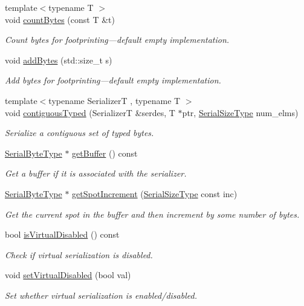 \begin{DoxyCompactItemize}
{\footnotesize template$<$typename T $>$ }\\void \hyperlink{structcheckpoint_1_1_serializer_a805ae9ce395614512dfb6b0bd2c22881}{count\+Bytes} (const T \&t)
\begin{DoxyCompactList}\small\item\em Count bytes for footprinting---default empty implementation. \end{DoxyCompactList}\item 
void \hyperlink{structcheckpoint_1_1_serializer_a52cd27806c3b821605d723900ec7d2e5}{add\+Bytes} (std\+::size\+\_\+t s)
\begin{DoxyCompactList}\small\item\em Add bytes for footprinting---default empty implementation. \end{DoxyCompactList}\item 
{\footnotesize template$<$typename SerializerT , typename T $>$ }\\void \hyperlink{structcheckpoint_1_1_serializer_af2f453fc63424918a16ea6024d576a3e}{contiguous\+Typed} (SerializerT \&serdes, T $\ast$ptr, \hyperlink{namespacecheckpoint_a083f6674da3f94c2901b18c6d238217c}{Serial\+Size\+Type} num\+\_\+elms)
\begin{DoxyCompactList}\small\item\em Serialize a contiguous set of typed bytes. \end{DoxyCompactList}\item 
\hyperlink{namespacecheckpoint_ae57f01cdc0b81776c23b6c7c934c58f5}{Serial\+Byte\+Type} $\ast$ \hyperlink{structcheckpoint_1_1_serializer_a6231bd380e02ee8668e7a6efebca2664}{get\+Buffer} () const
\begin{DoxyCompactList}\small\item\em Get a buffer if it is associated with the serializer. \end{DoxyCompactList}\item 
\hyperlink{namespacecheckpoint_ae57f01cdc0b81776c23b6c7c934c58f5}{Serial\+Byte\+Type} $\ast$ \hyperlink{structcheckpoint_1_1_serializer_af2fc82901c31232b7549b20a8732de30}{get\+Spot\+Increment} (\hyperlink{namespacecheckpoint_a083f6674da3f94c2901b18c6d238217c}{Serial\+Size\+Type} const inc)
\begin{DoxyCompactList}\small\item\em Get the current spot in the buffer and then increment by some number of bytes. \end{DoxyCompactList}\item 
bool \hyperlink{structcheckpoint_1_1_serializer_af45e225cdb3a750a06de80a8cd5c6c37}{is\+Virtual\+Disabled} () const
\begin{DoxyCompactList}\small\item\em Check if virtual serialization is disabled. \end{DoxyCompactList}\item 
void \hyperlink{structcheckpoint_1_1_serializer_af57d7cd51e94dd44a5be184456c2d59f}{set\+Virtual\+Disabled} (bool val)
\begin{DoxyCompactList}\small\item\em Set whether virtual serialization is enabled/disabled. \end{DoxyCompactList}\end{DoxyCompactItemize}
